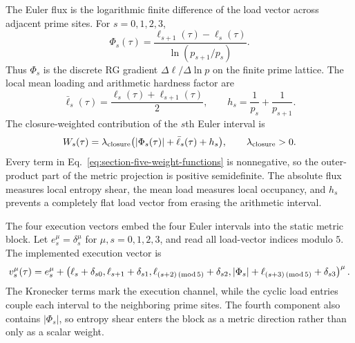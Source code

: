 \documentclass[11pt]{article}
\begin{document}
The Euler flux is the logarithmic finite difference of the load vector across
adjacent prime sites.  For $s=0,1,2,3$,
\begin{equation}
\label{eq:section-five-euler-flux}
 \Phi_s(\tau)
 =
 \frac{\ell_{s+1}(\tau)-\ell_s(\tau)}
 {\ln(p_{s+1}/p_s)}.
\end{equation}
Thus $\Phi_s$ is the discrete RG gradient
$\Delta\ell/\Delta\ln p$ on the finite prime lattice.  The local mean loading
and arithmetic hardness factor are
\begin{equation}
\label{eq:section-five-mean-loading-hardness}
 \bar\ell_s(\tau)
 =
 \frac{\ell_s(\tau)+\ell_{s+1}(\tau)}{2},
 \qquad
 h_s=\frac{1}{p_s}+\frac{1}{p_{s+1}}.
\end{equation}
The closure-weighted contribution of the $s$th Euler interval is
\begin{equation}
\label{eq:section-five-weight-functions}
 W_s(\tau)
 =
 \lambda_{\rm closure}
 \bigl(|\Phi_s(\tau)|+\bar\ell_s(\tau)+h_s\bigr),
 \qquad
 \lambda_{\rm closure}>0.
\end{equation}
Every term in Eq.~\eqref{eq:section-five-weight-functions} is nonnegative, so
the outer-product part of the metric projection is positive semidefinite.  The
absolute flux measures local entropy shear, the mean load measures local
occupancy, and $h_s$ prevents a completely flat load vector from erasing the
arithmetic interval.

The four execution vectors embed the four Euler intervals into the static
metric block.  Let $e_s^{\mu}=\delta_s^{\mu}$ for
$\mu,s=0,1,2,3$, and read all load-vector indices modulo $5$.  The implemented
execution vector is
\begin{equation}
\label{eq:section-five-execution-vectors}
 v_s^{\mu}(\tau)
 =
 e_s^{\mu}
 +
 \left(
 \ell_s+\delta_{s0},
 \ell_{s+1}+\delta_{s1},
 \ell_{(s+2)\,({\rm mod}\,5)}+\delta_{s2},
 |\Phi_s|+\ell_{(s+3)\,({\rm mod}\,5)}+\delta_{s3}
 \right)^{\mu}.
\end{equation}
The Kronecker terms mark the execution channel, while the cyclic load entries
couple each interval to the neighboring prime sites.  The fourth component also
contains $|\Phi_s|$, so entropy shear enters the block as a metric direction
rather than only as a scalar weight.
\end{document}
